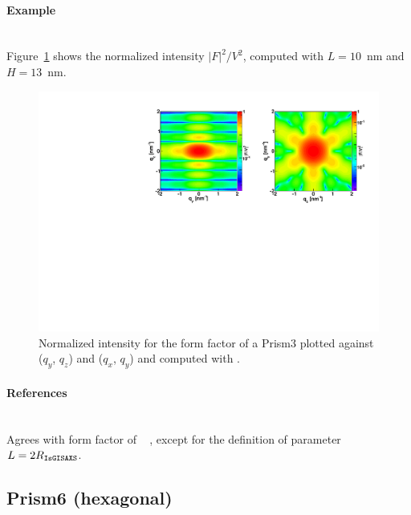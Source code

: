 \paragraph{Example}\strut\\
Figure~\ref{fig:FFprism3Ex} shows the normalized intensity
$|F|^2/V^2$, computed with $L=10$~nm and \mbox{$H=13$~nm.}
\begin{figure}[H]
\begin{center}
\includegraphics[angle=-90,width=\textwidth]{fig/ff/figffprism3.pdf}
\end{center}
\caption{Normalized intensity for the form factor of a Prism3
 plotted against ($q_y$, $q_z$) and  ($q_x$, $q_y$) and
  computed with .}
\label{fig:FFprism3Ex}
\end{figure}

\paragraph{References}\strut\\
Agrees with  form factor of \IsGISAXS\
\cite[Eq.~2.29]{Laz08} \cite[Eq.~219]{ReLL09},
except for the definition of parameter $L= 2 R_{\rm{\texttt{IsGISAXS}}}$.

\clearpage
\subsection{Prism6 (hexagonal)} \label{sec:Prism6}

